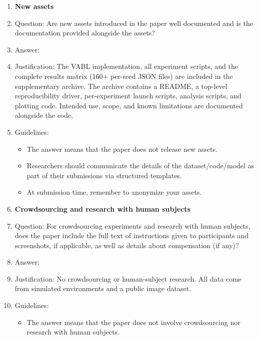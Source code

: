 \begin{enumerate}
\item {\bf New assets}
    \item[] Question: Are new assets introduced in the paper well documented and is the documentation provided alongside the assets?
    \item[] Answer: \answerYes{}
    \item[] Justification: The VABL implementation, all experiment scripts, and the complete results matrix (160{+} per-seed JSON files) are included in the supplementary archive. The archive contains a README, a top-level reproducibility driver, per-experiment launch scripts, analysis scripts, and plotting code. Intended use, scope, and known limitations are documented alongside the code.
    \item[] Guidelines:
    \begin{itemize}
        \item The answer \answerNA{} means that the paper does not release new assets.
        \item Researchers should communicate the details of the dataset\slash code\slash model as part of their submissions via structured templates.
        \item At submission time, remember to anonymize your assets.
    \end{itemize}

\item {\bf Crowdsourcing and research with human subjects}
    \item[] Question: For crowdsourcing experiments and research with human subjects, does the paper include the full text of instructions given to participants and screenshots, if applicable, as well as details about compensation (if any)?
    \item[] Answer: \answerNA{}
    \item[] Justification: No crowdsourcing or human-subject research. All data come from simulated environments and a public image dataset.
    \item[] Guidelines:
    \begin{itemize}
        \item The answer \answerNA{} means that the paper does not involve crowdsourcing nor research with human subjects.
    \end{itemize}


\end{enumerate}
